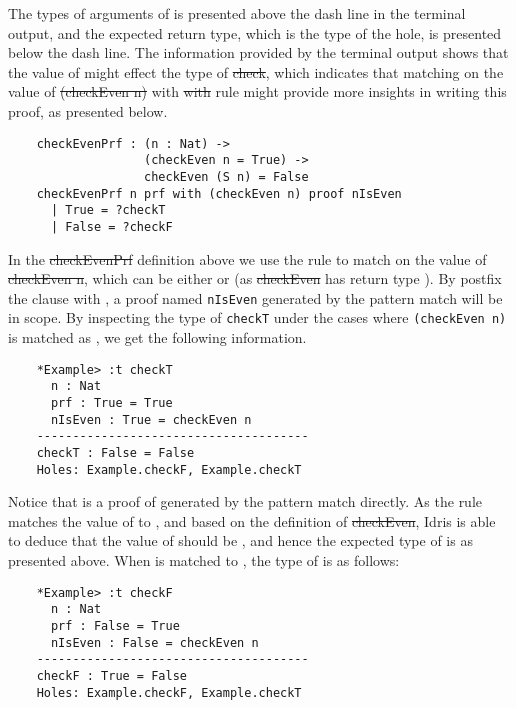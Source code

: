 The types of arguments of  is presented above the dash line in the terminal output, and the expected return type, which is the type of the  hole, is presented below the dash line. The information provided by the terminal output shows that the value of  might effect the type of \st{check}, which indicates that matching on the value of \st{(checkEven n)} with \st{with} rule might provide more insights in writing this proof, as presented below. 
\begin{lstlisting}
    checkEvenPrf : (n : Nat) -> 
                   (checkEven n = True) -> 
                   checkEven (S n) = False
    checkEvenPrf n prf with (checkEven n) proof nIsEven
      | True = ?checkT
      | False = ?checkF
\end{lstlisting}

In the \st{checkEvenPrf} definition above we use the  rule to match on the value of \st{checkEven n}, which can be either  or  (as \st{checkEven} has return type ). By postfix the  clause with , a proof named \texttt{nIsEven} generated by the pattern match will be in scope. By inspecting the type of \texttt{checkT} under the cases where \texttt{(checkEven n)} is matched as , we get the following information. 
\begin{lstlisting}
    *Example> :t checkT
      n : Nat
      prf : True = True
      nIsEven : True = checkEven n
    --------------------------------------
    checkT : False = False
    Holes: Example.checkF, Example.checkT
\end{lstlisting}

Notice that  is a proof of  generated by the pattern match directly. As the  rule matches the value of  to , and based on the definition of \st{checkEven}, Idris is able to deduce that the value of  should be , and hence the expected type of  is  as presented above. When  is matched to , the type of  is as follows: 
\begin{lstlisting}
    *Example> :t checkF
      n : Nat
      prf : False = True
      nIsEven : False = checkEven n
    --------------------------------------
    checkF : True = False
    Holes: Example.checkF, Example.checkT
\end{lstlisting}

